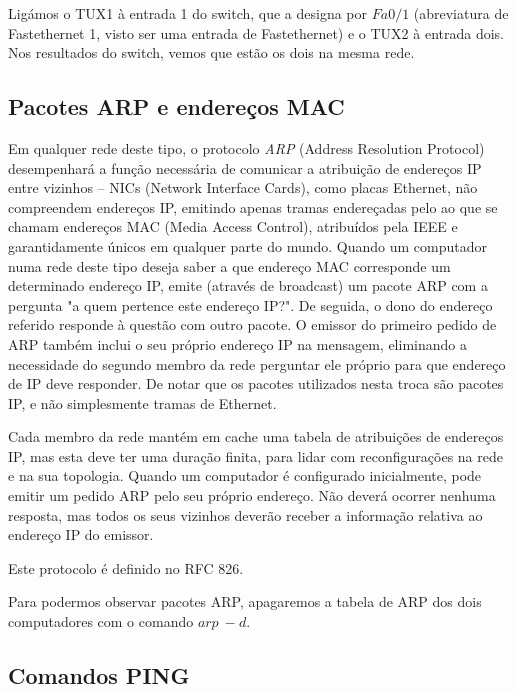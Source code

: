 \documentclass[a4paper,11pt,titlepage]{article}
\begin{document}

Ligámos o TUX1 à entrada 1 do switch, que a designa por $Fa0/1$ (abreviatura de
Fastethernet 1, visto ser uma entrada de Fastethernet) e o TUX2 à entrada dois.
Nos resultados do switch, vemos que estão os dois na mesma rede.

\subsection{Pacotes ARP e endereços MAC}

Em qualquer rede deste tipo, o protocolo \emph{ARP} (Address Resolution Protocol)
desempenhará a função necessária de comunicar a atribuição de endereços IP
entre vizinhos -- NICs (Network Interface Cards), como placas Ethernet, não
compreendem endereços IP, emitindo apenas tramas endereçadas pelo ao que se
chamam endereços MAC (Media Access Control), atribuídos pela IEEE e
garantidamente únicos em qualquer parte do mundo. Quando um computador numa
rede deste tipo deseja saber a que endereço MAC corresponde um determinado
endereço IP, emite (através de broadcast) um pacote ARP com a pergunta "a quem
pertence este endereço IP?". De seguida, o dono do endereço referido responde à
questão com outro pacote. O emissor do primeiro pedido de ARP também inclui o
seu próprio endereço IP na mensagem, eliminando a necessidade do segundo membro
da rede perguntar ele próprio para que endereço de IP deve responder.
De notar que os pacotes utilizados nesta troca são pacotes IP, e não
simplesmente tramas de Ethernet.

Cada membro da rede mantém em cache uma tabela de atribuições de endereços IP,
mas esta deve ter uma duração finita, para lidar com reconfigurações na rede e
na sua topologia. Quando um computador é configurado inicialmente, pode emitir
um pedido ARP pelo seu próprio endereço. Não deverá ocorrer nenhuma resposta,
mas todos os seus vizinhos deverão receber a informação relativa ao endereço IP
do emissor.

Este protocolo é definido no RFC 826.

Para podermos observar pacotes ARP, apagaremos a tabela de ARP dos dois
computadores com o comando $arp\ -d$.

\subsection{Comandos PING}

\end{document}
